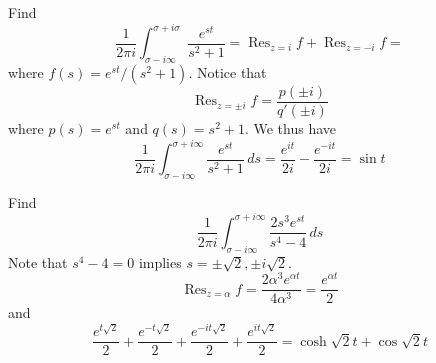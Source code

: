 \vspace{2ex}
\begin{ex}
Find
\[\dfrac{1}{2\pi i}\int ^{\sigma +i\sigma }_{\sigma -i\infty }\dfrac{e^{st}}{s^2+1}=\mathop{\mathrm{Res}}_{z=i}f+\mathop{\mathrm{Res}}_{z=-i}f=\]
where $f(s)=e^{st}/(s^2+1)$. Notice that
\[\mathop{\mathrm{Res}}_{z=\pm i}f=\dfrac{p(\pm i)}{q'(\pm i)}\]
where $p(s)=e^{st}$ and $q(s)=s^2+1$. We thus have
\[\dfrac{1}{2\pi i}\int ^{\sigma +i\infty }_{\sigma -i\infty }\dfrac{e^{st}}{s^2+1}\,ds=\dfrac{e^{it}}{2i}-\dfrac{e^{-it}}{2i}=\sin t\]
\end{ex}
\vspace{2ex}
\begin{ex}
Find
\[\dfrac{1}{2\pi i}\int ^{\sigma +i\infty }_{\sigma -i\infty }\dfrac{2s^3e^{st}}{s^{4}-4}\,ds\]
Note that $s^{4}-4=0$ implies $s=\pm \sqrt{2},\pm i\sqrt{2}$.
\[\mathop{\mathrm{Res}}_{z=\alpha }f=\dfrac{2\alpha ^3e^{\alpha t}}{4\alpha ^3}=\dfrac{e^{\alpha t}}{2}\]
and
\[\dfrac{e^{t\sqrt{2}}}{2}+\dfrac{e^{-t\sqrt{2}}}{2}+\dfrac{e^{-it\sqrt{2}}}{2}+\dfrac{e^{it\sqrt{2}}}{2}=\cosh \sqrt{2}t+\cos \sqrt{2}t\]

\end{ex}
\vspace{2ex}
 
